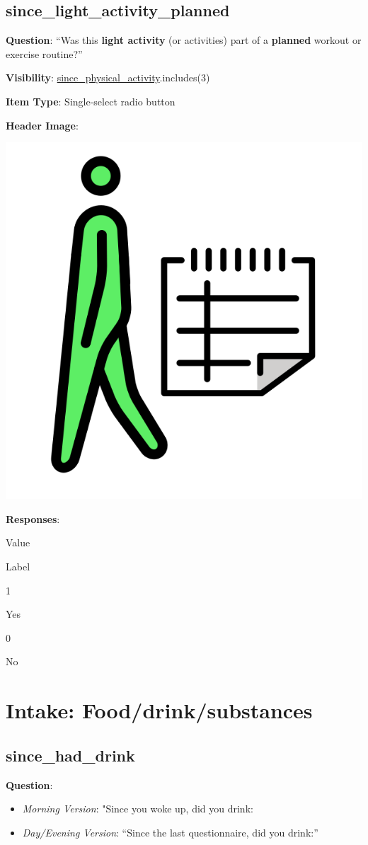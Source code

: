\documentclass[]{book}
\providecommand{\tightlist}{%
  \setlength{\itemsep}{0pt}\setlength{\parskip}{0pt}}
\begin{document}
\hypertarget{since_light_activity_planned}{%
\section{since\_light\_activity\_planned}\label{since_light_activity_planned}}

\textbf{Question}: ``Was this \textbf{light activity} (or activities) part of a \textbf{planned} workout or exercise routine?''

\textbf{Visibility}: \protect\hyperlink{since_physical_activity}{since\_physical\_activity}.includes(3)

\textbf{Item Type}: Single-select radio button

\textbf{Header Image}:

\begin{flushleft}\includegraphics[width=0.33\linewidth]{downloadFigs4latex_NIMH_Applet_Codebook/since_light_activity_planned_headerImg} \end{flushleft}

\textbf{Responses}:

Value

Label

1

Yes

0

No

\hypertarget{intake_section}{%
\chapter{Intake: Food/drink/substances}\label{intake_section}}

\hypertarget{since_had_drink}{%
\section{since\_had\_drink}\label{since_had_drink}}

\textbf{Question}:

\begin{itemize}
\tightlist
\item
  \emph{Morning Version}: "Since you woke up, did you drink:
\item
  \emph{Day/Evening Version}: ``Since the last questionnaire, did you drink:''
\end{itemize}
\end{document}
